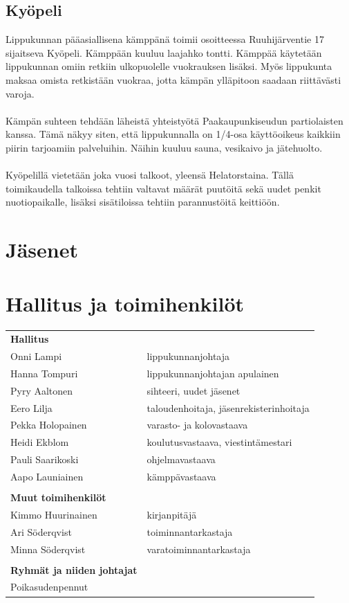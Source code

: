 \documentclass[a4paper, 12pt, finnish]{report} %
\begin{document}
\subsection{Kyöpeli}
Lippukunnan pääasiallisena kämppänä toimii osoitteessa Ruuhijärventie 17 sijaitseva Kyöpeli. Kämppään kuuluu laajahko tontti. Kämppää käytetään lippukunnan omiin retkiin ulkopuolelle vuokrauksen lisäksi. Myös lippukunta maksaa omista retkistään vuokraa, jotta kämpän ylläpitoon saadaan riittävästi varoja.\\
\\Kämpän suhteen tehdään läheistä yhteistyötä Paakaupunkiseudun partiolaisten kanssa. Tämä näkyy siten, että lippukunnalla on 1/4-osa käyttöoikeus kaikkiin piirin tarjoamiin palveluihin. Näihin kuuluu sauna, vesikaivo ja jätehuolto.\\
\\Kyöpelillä vietetään joka vuosi talkoot, yleensä Helatorstaina. Tällä toimikaudella talkoissa tehtiin valtavat määrät puutöitä sekä uudet penkit nuotiopaikalle, lisäksi sisätiloissa tehtiin parannustöitä keittiöön.
\section{Jäsenet}
\section{Hallitus ja toimihenkilöt}
\begin{center}
	\begin{tabular}{ l l }
		\textbf{Hallitus} & \\
		Onni Lampi & lippukunnanjohtaja\\
		Hanna Tompuri & lippukunnanjohtajan apulainen\\
		Pyry Aaltonen & sihteeri, uudet jäsenet\\
		Eero Lilja & taloudenhoitaja, jäsenrekisterinhoitaja\\
		Pekka Holopainen & varasto- ja kolovastaava\\
		Heidi Ekblom & koulutusvastaava, viestintämestari\\
		Pauli Saarikoski & ohjelmavastaava\\
		Aapo Launiainen & kämppävastaava\\
					      & \\
		\textbf{Muut toimihenkilöt} & \\
		Kimmo Huurinainen & kirjanpitäjä\\
		Ari Söderqvist & toiminnantarkastaja\\
		Minna Söderqvist & varatoiminnantarkastaja\\
						& \\
		\textbf{Ryhmät ja niiden johtajat} & \\
		Poikasudenpennut & \\ 
	\end{tabular}
\end{center}
\end{document}
